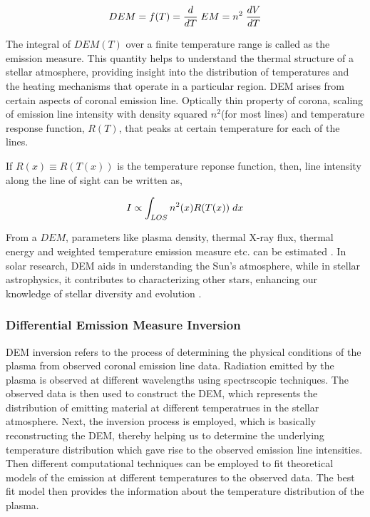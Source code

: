 \vspace{-.75cm}
\everymath{\displaystyle}
\begin{center}
    \begin{equation*}
        DEM = f(T) = \frac{d}{dT}\hspace{0.1cm} EM = n^2 \hspace{0.1cm} \frac{dV}{dT}
    \end{equation*}
\end{center}

The integral of $DEM(T)$ over a finite temperature range is called as the emission measure. This quantity helps to understand the thermal structure of a stellar atmosphere, providing insight into the distribution of temperatures and the heating mechanisms that operate in a particular region. DEM arises from certain aspects of coronal emission line. Optically thin property of corona, scaling of emission line intensity with density squared $n^2$(for most lines) and temperature response function, $R(T)$, that peaks at certain temperature for each of the lines.

If $R(x) \equiv R(T(x))$ is the temperature reponse function, then, line intensity along the line of sight can be written as,

\vspace{-.75cm}
\begin{center}
    \begin{equation*}
        I \propto \int_{LOS} n^2(x) R(T(x)) \hspace{0.1cm} dx
    \end{equation*}
\end{center}


From a $DEM$, parameters like plasma density, thermal X-ray flux, thermal energy and weighted temperature emission measure etc. can be estimated \citep{Su2018-fq}. In solar research, DEM aids in understanding the Sun's atmosphere, while in stellar astrophysics, it contributes to characterizing other stars, enhancing our knowledge of stellar diversity and evolution \citep{Namekata2023-rq}.

\subsubsection{Differential Emission Measure Inversion}

DEM inversion refers to the process of determining the physical conditions of the plasma from observed coronal emission line data. Radiation emitted by the plasma is observed at different wavelengths using spectrscopic techniques. The observed data is then used to construct the DEM, which represents the distribution of emitting material at different temperatrues in the stellar atmosphere. Next, the inversion process is employed, which is basically reconstructing the DEM, thereby helping us to determine the underlying temperature distribution which gave rise to the observed emission line intensities. Then different computational techniques can be employed to fit theoretical models of the emission at different temperatures to the observed data. The best fit model then provides the information about the temperature distribution of the plasma.\\

